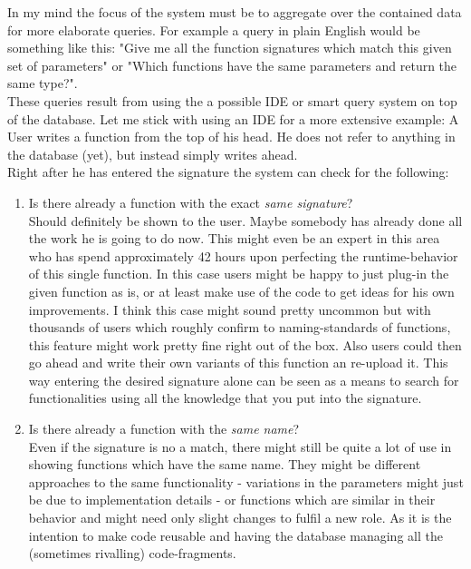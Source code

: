 \documentclass[twoside, 11pt]{scrartcl}
\begin{document}
In my mind the focus of the system must be to aggregate over the contained data for more elaborate queries. For example a query in plain English would be something like this: "Give me all the function signatures which match this given set of parameters" or "Which functions have the same parameters and return the same type?".\\
These queries result from using the a possible IDE or smart query system on top of the database. Let me stick with using an IDE for a more extensive example: A User writes a function from the top of his head. He does not refer to anything in the database (yet), but instead simply writes ahead. \\
Right after he has entered the signature the system can check for the following: 
\begin{enumerate}
	\item Is there already a function with the exact \emph{same signature}?\\
Should definitely be shown to the user. Maybe somebody has already done all the work he is going to do now. This might even be an expert in this area who has spend approximately 42 hours upon perfecting the runtime-behavior of this single function. In this case users might be happy to just plug-in the given function as is, or at least make use of the code to get ideas for his own improvements. I think this case might sound pretty uncommon but with thousands of users which roughly confirm to naming-standards of functions, this feature might work pretty fine right out of the box. Also users could then go ahead and write their own variants of this function an re-upload it. This way entering the desired signature alone can be seen as a means to search for functionalities using all the knowledge that you put into the signature.

	\item Is there already a function with the \emph{same name}?\\
Even if the signature is no a match, there might still be quite a lot of use in showing functions which have the same name. They might be different approaches to the same functionality - variations in the parameters might just be due to implementation details - or functions which are similar in their behavior and might need only slight changes to fulfil a new role. As it is the intention to make code reusable and having the database managing all the (sometimes rivalling) code-fragments.


\end{enumerate}
\end{document}
